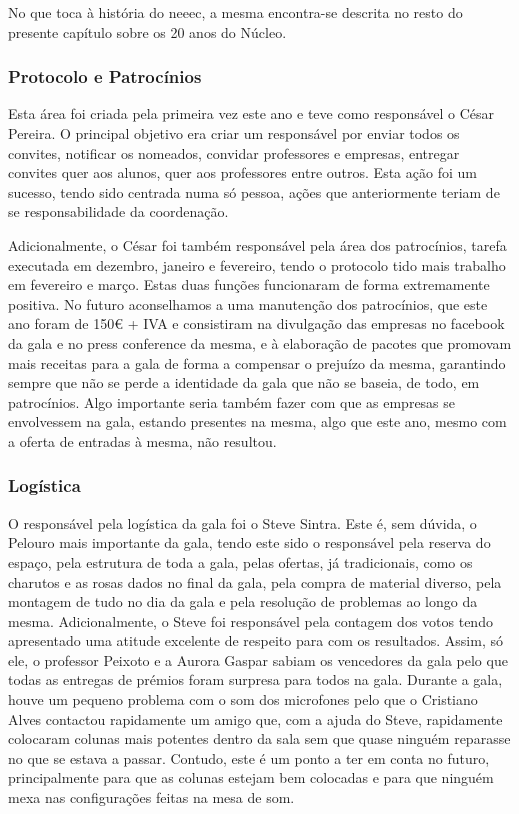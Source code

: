 No que toca à história do \acrshort{neeec}, a mesma encontra-se descrita no resto do presente capítulo sobre os 20 anos do Núcleo.

\subsubsection{Protocolo e Patrocínios}
Esta área foi criada pela primeira vez este ano e teve como responsável o César Pereira. O principal objetivo era criar um responsável por enviar todos os convites, notificar os nomeados, convidar professores e empresas, entregar convites quer aos alunos, quer aos professores entre outros. Esta ação foi um sucesso, tendo sido centrada numa só pessoa, ações que anteriormente teriam de se responsabilidade da coordenação.

Adicionalmente, o César foi também responsável pela área dos patrocínios, tarefa executada em dezembro, janeiro e fevereiro, tendo o protocolo tido mais trabalho em fevereiro e março. Estas duas funções funcionaram de forma extremamente positiva. No futuro aconselhamos a uma manutenção dos patrocínios, que este ano foram de 150€ + IVA e consistiram na divulgação das empresas no facebook da gala e no press conference da mesma, e à elaboração de pacotes que promovam mais receitas para a gala de forma a compensar o prejuízo da mesma, garantindo sempre que não se perde a identidade da gala que não se baseia, de todo, em patrocínios. Algo importante seria também fazer com que as empresas se envolvessem na gala, estando presentes na mesma, algo que este ano, mesmo com a oferta de entradas à mesma, não resultou.

\subsubsection{Logística}

O responsável pela logística da gala foi o Steve Sintra. Este é, sem dúvida, o Pelouro mais importante da gala, tendo este sido o responsável pela reserva do espaço, pela estrutura de toda a gala, pelas ofertas, já tradicionais, como os charutos e as rosas dados no final da gala, pela compra de material diverso, pela montagem de tudo no dia da gala e pela resolução de problemas ao longo da mesma. Adicionalmente, o Steve foi responsável pela contagem dos votos tendo apresentado uma atitude excelente de respeito para com os resultados. Assim, só ele, o professor Peixoto e a Aurora Gaspar sabiam os vencedores da gala pelo que todas as entregas de prémios foram surpresa para todos na gala. Durante a gala, houve um pequeno problema com o som dos microfones pelo que o Cristiano Alves contactou rapidamente um amigo que, com a ajuda do Steve, rapidamente colocaram colunas mais potentes dentro da sala sem que quase ninguém reparasse no que se estava a passar. Contudo, este é um ponto a ter em conta no futuro, principalmente para que as colunas estejam bem colocadas e para que ninguém mexa nas configurações feitas na mesa de som.

